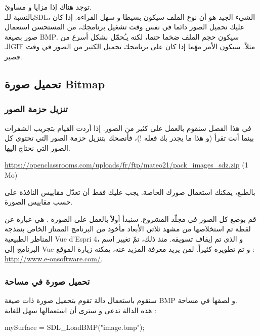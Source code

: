 توجد هناك إذا مزايا و مساوئ.\\
بالنسبة للـ\textenglish{SDL}،
الشيء الجيد هو أن نوع الملف سيكون بسيطا و سهل القراءة. إذا كان عليك تحميل الصور دائما في نفس وقت تشغيل برنامجك، من المستحسن استعمال صور بصيغة 
\textenglish{BMP}.
سيكون حجم الملف ضخما حتما، لكنه يـُحمّل بشكل أسرع من الـ\textenglish{GIF}
مثلاً. سيكون الأمر مهّما إذا كان على برنامجك تحميل الكثير من الصور في وقت قصير.

\subsection{تحميل صورة \textenglish{Bitmap}}

\subsubsection{تنزيل حزمة الصور}

في هذا الفصل سنقوم بالعمل على كثير من الصور. إذا أردت القيام بتجريب الشفرات بينما أنت تقرأ (و هذا ما يجدر بك فعله !)، فأنصحك بتنزيل حزمة الصور التي تحتوي كل الصور التي نحتاج إليها.

\textenglish{\url{https://openclassrooms.com/uploads/fr/ftp/mateo21/pack_images_sdz.zip} (1 Mo)}

بالطبع، يمكنك استعمال صورك الخاصة. يجب عليك فقط أن تعدّل مقاييس النافذة على حسب مقاييس الصورة.

قم بوضع كل الصور في مجلّد المشروع. سنبدأ أولاّ بالعمل على الصورة 
.
هي عبارة عن لقطة تم استخلاصها من مشهد ثلاثي الأبعاد مأخوذ من البرنامج الممتاز الخاص بنمذجة المناظر الطبيعية
\textenglish{Vue d'Espri 4}،
و الذي تم إيقاف تسويقه. منذ ذلك، تمّ تغيير اسم البرنامج إلى
\textenglish{Vue}
و تم تطويره كثيراً. لمن يريد معرفة المزيد عنه، يمكنه زيارة الموقع :\\
\url{http://www.e-onsoftware.com/}.

\subsubsection{تحميل صورة في مساحة}

سنقوم باستعمال دالة تقوم بتحميل صورة ذات صيغة
\textenglish{BMP}
و لصقها في مساحة.\\
هذه الدالة تدعى 
و سترى أن استعمالها سهل للغاية :

\begin{Csource}
mySurface = SDL_LoadBMP("image.bmp");
\end{Csource}

